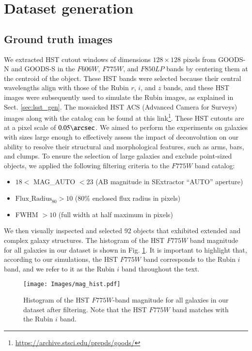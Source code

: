 \documentclass[traditabstract]{aa}
\begin{document}
\section{Dataset generation}
\label{sec:data_exp}

\subsection{Ground truth images}
\label{sec:gt_hst}

We extracted HST cutout windows of dimensions $128 \times 128$ pixels from GOODS-N and GOODS-S \citep{goods} in the $F606W$, $F775W$, and $F850LP$ bands by centering them at the centroid of the object. These HST bands were selected because their central wavelengths align with those of the Rubin $r$, $i$, and $z$ bands, and these HST images were subsequently used to simulate the Rubin images, as explained in Sect. \ref{sec:lsst_gen}. The mosaicked HST ACS (Advanced Camera for Surveys) images along with the catalog can be found at this link\footnote{\url{https://archive.stsci.edu/prepds/goods/}\label{foot}}. These HST cutouts are at a pixel scale of $0.05\arcsec$. We aimed to perform the experiments on galaxies with sizes large enough to effectively assess the impact of deconvolution on our ability to resolve their structural and morphological features, such as arms, bars, and clumps. To ensure the selection of large galaxies and exclude point-sized objects, we applied the following filtering criteria to the $F775W$ band catalog:
\begin{itemize}
    \item $18 <$ MAG\_AUTO $< 23$  (AB magnitude in SExtractor “AUTO” aperture)
    \item $\text{Flux\_Radius}_{80} > 10$ ($80\%$ enclosed flux radius in pixels)
    \item FWHM $> 10$ (full width at half maximum in pixels)
\end{itemize}

We then visually inspected and selected 92 objects that exhibited extended and complex galaxy structures. The histogram of the HST $F775W$ band magnitude for all galaxies in our dataset is shown in Fig. \ref{fig:mag_hist}. It is important to highlight that, according to our simulations, the HST $F775W$ band corresponds to the Rubin $i$ band, and we refer to it as the Rubin $i$ band throughout the text.

\begin{figure}[h!]
    \centering
    \label{fig:mag_hist}\texttt{[image: Images/mag\_hist.pdf]}
    \caption{Histogram of the HST $F775W$-band magnitude for all galaxies in our dataset after filtering. Note that the HST $F775W$ band matches with the Rubin $i$ band.}
    \label{fig:mag_hist}
\end{figure}
\end{document}
